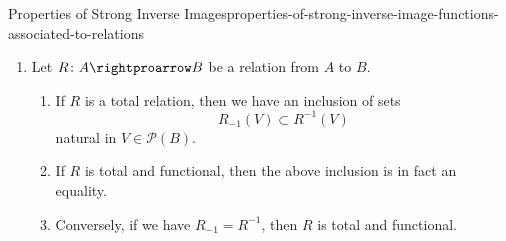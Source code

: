 \begin{proposition}{Properties of Strong Inverse Images}{properties-of-strong-inverse-image-functions-associated-to-relations}
\begin{enumerate}
\[                =%
                A\setminus R^{-1}(B\setminus V)
            \]%
            for each $V\in\mathcal{P}(B)$.
        \item\label{properties-of-strong-inverse-image-functions-associated-to-relations-interaction-with-weak-inverse-images-2}Let $R\colon A\rightproarrow B$ be a relation from $A$ to $B$.
            \begin{enumerate}
                \item\label{properties-of-strong-inverse-image-functions-associated-to-relations-interaction-with-weak-inverse-images-2-a}If $R$ is a total relation, then we have an inclusion of sets
                    \[
                        R_{-1}(V)
                        \subset
                        R^{-1}(V)
                    \]%
                    natural in $V\in\mathcal{P}(B)$.
                \item\label{properties-of-strong-inverse-image-functions-associated-to-relations-interaction-with-weak-inverse-images-2-b}If $R$ is total and functional, then the above inclusion is in fact an equality.
                \item\label{properties-of-strong-inverse-image-functions-associated-to-relations-interaction-with-weak-inverse-images-2-c}Conversely, if we have $R_{-1}=R^{-1}$, then $R$ is total and functional.
            \end{enumerate}
    \end{enumerate}
\end{proposition}
